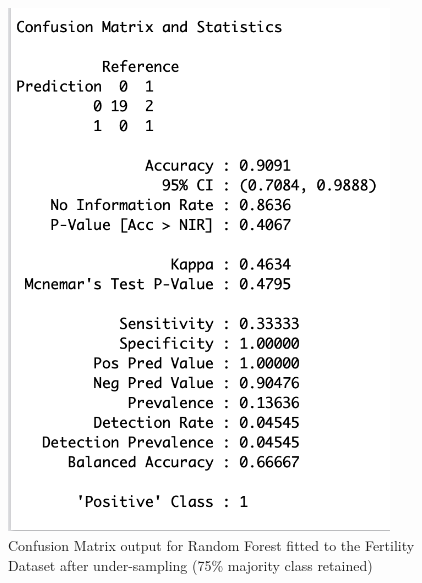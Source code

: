 \begin{figure}[!htbp]
    \centering
    \begin{minipage}{0.45\textwidth}
        \centering
        \includegraphics[width=0.9\textwidth]{ThesisTemplate/appendix/images/Chapter5Appendix/ConfusionMatrix75/Fertility.png}
        \caption{Confusion Matrix output for Random Forest fitted to the Fertility Dataset after under-sampling (75\% majority class retained)}
        \label{fig:my_label}
    \end{minipage}\hfill
    \begin{minipage}{0.45\textwidth}
        \centering

\end{minipage}
\end{figure}
